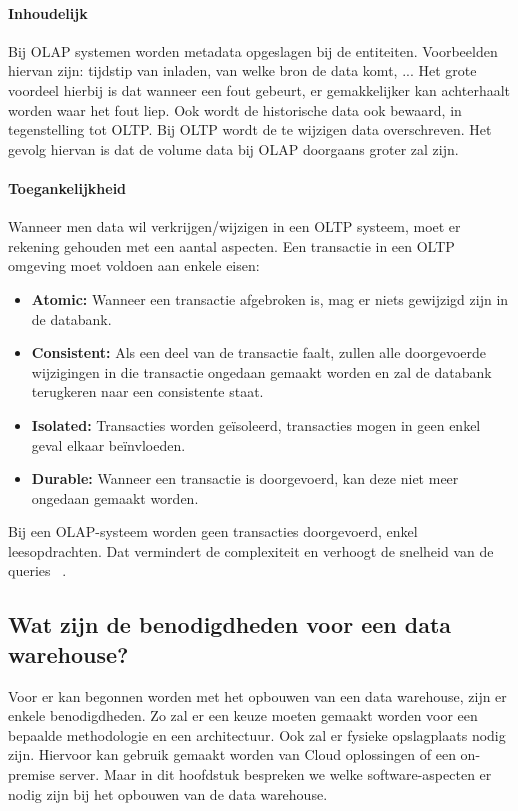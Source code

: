 \paragraph{Inhoudelijk}
Bij OLAP systemen worden metadata opgeslagen bij de entiteiten. Voorbeelden hiervan zijn: tijdstip van inladen, van welke bron de data komt, ... Het grote voordeel hierbij is dat wanneer een fout gebeurt, er gemakkelijker kan achterhaalt worden waar het fout liep. Ook wordt de historische data ook bewaard, in tegenstelling tot OLTP. Bij OLTP wordt de te wijzigen data overschreven. Het gevolg hiervan is dat de volume data bij OLAP doorgaans groter zal zijn.

\paragraph{Toegankelijkheid}
Wanneer men data wil verkrijgen/wijzigen in een OLTP systeem, moet er rekening gehouden met een aantal aspecten. Een transactie in een OLTP omgeving moet voldoen aan enkele eisen:
\begin{itemize}
	\item \textbf{Atomic:} Wanneer een transactie afgebroken is, mag er niets gewijzigd zijn in de databank.
	\item \textbf{Consistent:} Als een deel van de transactie faalt, zullen alle doorgevoerde wijzigingen in die transactie ongedaan gemaakt worden en zal de databank terugkeren naar een consistente staat.
	\item \textbf{Isolated:} Transacties worden geïsoleerd, transacties mogen in geen enkel geval elkaar beïnvloeden.
	\item \textbf{Durable:} Wanneer een transactie is doorgevoerd, kan deze niet meer ongedaan gemaakt worden.
\end{itemize}  

Bij een OLAP-systeem worden geen transacties doorgevoerd, enkel leesopdrachten. Dat vermindert de complexiteit en verhoogt de snelheid van de queries ~\autocite{Satyanarayana2010}. 

\subsection{Wat zijn de benodigdheden voor een data warehouse?}
Voor er kan begonnen worden met het opbouwen van een data warehouse, zijn er enkele benodigdheden. Zo zal er een keuze moeten gemaakt worden voor een bepaalde methodologie en een architectuur. Ook zal er fysieke opslagplaats nodig zijn. Hiervoor kan gebruik gemaakt worden van Cloud oplossingen of een on-premise server. Maar in dit hoofdstuk bespreken we welke software-aspecten er nodig zijn bij het opbouwen van de data warehouse.

